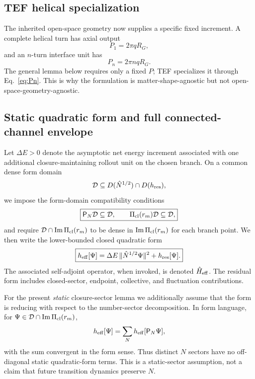 \documentclass[10pt]{article}
\begin{document}
\subsection{TEF helical specialization}

The inherited open-space geometry now supplies a specific fixed increment. A complete helical turn has axial output
\begin{equation}
P_1=2\pi qR_G,
\end{equation}
and an $n$-turn interface unit has
\begin{equation}
\boxed{P_n=2\pi n qR_G.}
\label{eq:Pn}
\end{equation}
The general lemma below requires only a fixed $P$; TEF specializes it through Eq.~\eqref{eq:Pn}. This is why the formulation is matter-shape-agnostic but not open-space-geometry-agnostic.

\subsection{Static quadratic form and full connected-channel envelope}

Let $\Delta E>0$ denote the asymptotic net energy increment associated with one additional closure-maintaining rollout unit on the chosen branch. On a common dense form domain
\begin{equation}
\mathcal D\subseteq D(\hat N^{1/2})\cap D(h_{\rm res}),
\end{equation}
we impose the form-domain compatibility conditions
\begin{equation}
\boxed{
\mathsf P_N\mathcal D\subseteq\mathcal D,
\qquad
\Pi_{\rm cl}(r_m)\mathcal D\subseteq\mathcal D,
}
\label{eq:domainInvariant}
\end{equation}
and require $\mathcal D\cap\operatorname{Im}\Pi_{\rm cl}(r_m)$ to be dense in $\operatorname{Im}\Pi_{\rm cl}(r_m)$ for each branch point. We then write the lower-bounded closed quadratic form
\begin{equation}
\boxed{
h_{\rm eff}[\Psi]
=\Delta E\,\|\hat N^{1/2}\Psi\|^2+h_{\rm res}[\Psi].
}
\label{eq:Heff}
\end{equation}
The associated self-adjoint operator, when invoked, is denoted $\hat H_{\rm eff}$. The residual form includes closed-sector, endpoint, collective, and fluctuation contributions.

For the present \emph{static} closure-sector lemma we additionally assume that the form is reducing with respect to the number-sector decomposition. In form language, for $\Psi\in\mathcal D\cap\operatorname{Im}\Pi_{\rm cl}(r_m)$,
\begin{equation}
h_{\rm eff}[\Psi]
=\sum_N h_{\rm eff}[\mathsf P_N\Psi],
\label{eq:formDirectSum}
\end{equation}
with the sum convergent in the form sense. Thus distinct $N$ sectors have no off-diagonal static quadratic-form terms. This is a static-sector assumption, not a claim that future transition dynamics preserve $N$.
\end{document}
